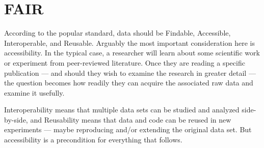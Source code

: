 
\section{FAIR}\fbeg{}\begin{frame}{}

\begin{ftxt}

According to the popular  standard, data should be 
Findable, Accessible, Interoperable, and Reusable.  Arguably 
the most important consideration here is accessibility.  
In the typical case, a researcher will learn about 
some scientific work or experiment from peer-reviewed 
literature.  Once they are reading a specific 
publication --- and should they wish to examine 
the research in greater detail --- the question becomes 
how readily they can acquire the associated raw 
data and examine it usefully.\\\vspace{-13pt}

Interoperability means that multiple data sets can be 
studied and analyzed side-by-side, and Reusability 
means that data and code can be reused in new experiments 
--- maybe reproducing and/or extending the original 
data set.  But accessibility is a precondition for everything 
that follows.

\end{ftxt}

\end{frame}

